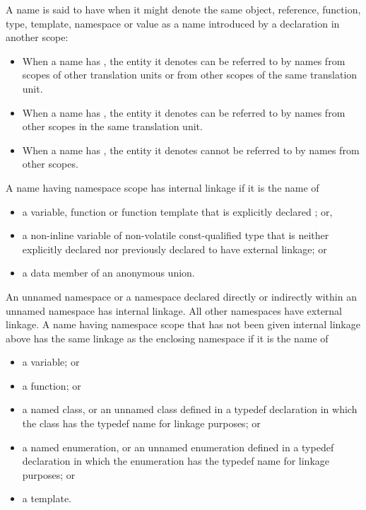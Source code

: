 \pnum
{}%
%
%
%
A name is said to have  when it might denote the same
object, reference, function, type, template, namespace or value as a
name introduced by a declaration in another scope:
\begin{itemize}
\item When a name has ,
the entity it denotes
can be referred to by names from scopes of other translation units or
from other scopes of the same translation unit.

\item When a name has ,
the entity it denotes
can be referred to by names from other scopes in the same translation
unit.

\item When a name has , the entity it denotes
cannot be referred to by names from other scopes.
\end{itemize}

\pnum
{}%
%
%
%
%
%
A name having namespace scope has internal
linkage if it is the name of
\begin{itemize}
\item
  a variable, function or function template that is
  explicitly declared ; or,
\item
  a non-inline variable of non-volatile const-qualified type that is
  neither explicitly declared  nor previously
  declared to have external linkage; or
\item
  a data member of an anonymous union.
\end{itemize}

\pnum
An unnamed namespace or a namespace declared directly or indirectly within an
unnamed namespace has internal linkage. All other namespaces have external linkage.
A name having namespace scope
that has not been given internal linkage above
has the same linkage as the enclosing namespace if it is the name of
\begin{itemize}
\item a variable; or
\item a function; or
\item {}%
a named class, or an unnamed class defined in a
typedef declaration in which the class has the typedef name for linkage
purposes; or
\item {}%
a named enumeration, or an unnamed enumeration defined
in a typedef declaration in which the enumeration has the typedef name
for linkage purposes; or
\item a template.
\end{itemize}

